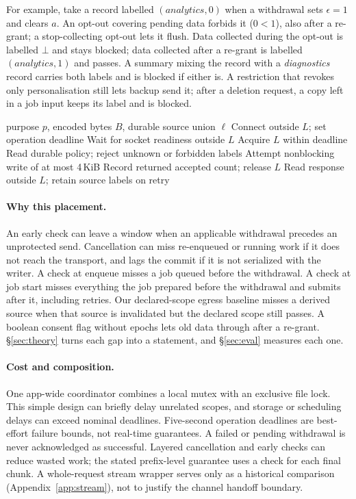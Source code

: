 For example, take a record labelled $(\textit{analytics},0)$ when a withdrawal sets $\epsilon=1$ and clears $a$. An opt-out
covering pending data forbids it ($0<1$), also after a re-grant; a stop-collecting opt-out lets it flush. Data collected
during the opt-out is labelled $\bot$ and stays blocked; data collected after a re-grant is labelled
$(\textit{analytics},1)$ and passes. A summary mixing the record with a \textit{diagnostics} record carries both labels and
is blocked if either is. A restriction that revokes only personalisation still lets backup send it; after a deletion
request, a copy left in a job input keeps its label and is blocked.

\begin{algorithm}[t]
\caption{Audited HTTP fence, with source labels on every retry}
\label{alg:fence}
\begin{algorithmic}[1]
\Require purpose $p$, encoded bytes $B$, durable source union $\ell$
\State Connect outside $L$; set operation deadline
\State Wait for socket readiness outside $L$
\State Acquire $L$ within deadline
\State Read durable policy; reject unknown or forbidden labels
\State Attempt nonblocking write of at most 4\,KiB
\State Record returned accepted count; release $L$
\EndWhile
\State Read response outside $L$; retain source labels on retry
\end{algorithmic}
\end{algorithm}

\paragraph{Why this placement.} An early check can leave a window when an applicable withdrawal precedes an unprotected send.
Cancellation can miss re-enqueued or running work if it does not reach the transport, and lags the commit if it is not
serialized with the writer. A check at enqueue misses a job queued before the withdrawal. A check at
job start misses everything the job prepared before the withdrawal and submits after it, including retries. Our declared-scope egress baseline misses a derived source when that source is invalidated
but the declared scope still passes. A boolean
consent flag without epochs lets old data through after a re-grant. \S\ref{sec:theory} turns each gap into a statement, and
\S\ref{sec:eval} measures each one.

\paragraph{Cost and composition.} One app-wide coordinator combines a local mutex with an
exclusive file lock. This simple design can briefly delay unrelated scopes, and storage or
scheduling delays can exceed nominal deadlines. Five-second operation deadlines are best-effort
failure bounds, not real-time guarantees. A failed or pending withdrawal is never acknowledged
as successful. Layered cancellation and early checks can reduce wasted work; the stated prefix-level guarantee uses a check for each final chunk. A whole-request stream wrapper serves only as a historical comparison
(Appendix~\ref{app:stream}), not to justify the channel handoff boundary.
